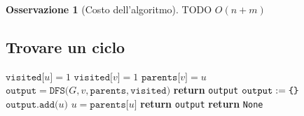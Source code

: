 \documentclass[14pt]{extreport}
\theoremstyle{definition}
\theoremstyle{definition}
\newtheorem{remark}{Osservazione}[subsection]
\begin{document}
\begin{remark}[Costo dell'algoritmo]
    TODO $O(n + m)$
\end{remark}

\subsection{Trovare un ciclo}

\begin{algorithm}[H]
    \caption{
        Dato un grafo indiretto $G$, rappresentato attraverso liste di adiacenza, l'algoritmo restituisce un suo ciclo, se presente.\\
        \textbf{Input}: $G$ grafo indiretto, rappresentato attraverso liste di adiacenza.\\
        \textbf{Output}: un ciclo di $G$, se presente.
    }

    \begin{algorithmic}[1]
            \State $\texttt{visited[}u\texttt{]} = 1$
                    \State $\texttt{visited[}v\texttt{]} = 1$
                    \State $\texttt{parents[}v\texttt{]} = u$
                    \State $\texttt{output} = \texttt{DFS(}G, v, \texttt{parents}, \texttt{visited)}$
                        \State \textbf{return} \texttt{output}
                    \EndIf
                     
                    \State $\texttt{output} := \verb|{| \verb|}|$
                        \State $\texttt{output.add(}u\texttt{)}$
                        \State $u = \texttt{parents[}u\texttt{]}$
                    \EndWhile
                    \State \textbf{return} \texttt{output}
                \EndIf
            \EndFor
            \State \textbf{return} \texttt{None}
        \EndFunction
    \end{algorithmic}
\end{algorithm}
\end{document}
